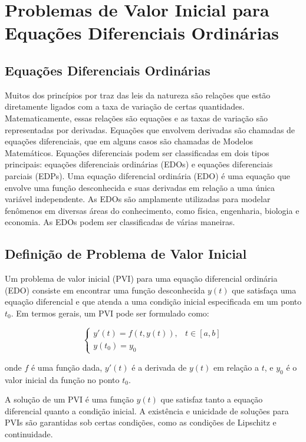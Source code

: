 \chapter{Problemas de Valor Inicial para Equações Diferenciais Ordinárias}

\section{Equações Diferenciais Ordinárias}
Muitos dos princípios por traz das leis da natureza são relações que estão diretamente ligados com a taxa de variação de certas quantidades. Matematicamente, essas relações são equações e as taxas de variação são representadas por derivadas. Equações que envolvem derivadas são chamadas de equações diferenciais, que em alguns casos são chamadas de Modelos Matemáticos. Equações diferenciais podem ser classificadas em dois tipos principais: equações diferenciais ordinárias (EDOs) e equações diferenciais parciais (EDPs).
Uma equação diferencial ordinária (EDO) é uma equação que envolve uma função desconhecida e suas derivadas em relação a uma única variável independente. As EDOs são amplamente utilizadas para modelar fenômenos em diversas áreas do conhecimento, como física, engenharia, biologia e economia. As EDOs podem ser classificadas de várias maneiras.

\section{Definição de Problema de Valor Inicial}

Um problema de valor inicial (PVI) para uma equação diferencial ordinária (EDO) consiste em encontrar uma função desconhecida $y(t)$ que satisfaça uma equação diferencial e que atenda a uma condição inicial especificada em um ponto $t_0$. Em termos gerais, um PVI pode ser formulado como:

\begin{equation}
    \begin{cases}
        y'(t) = f(t, y(t)), & t \in [a, b] \\
        y(t_0) = y_0
    \end{cases}
\end{equation}

onde $f$ é uma função dada, $y'(t)$ é a derivada de $y(t)$ em relação a $t$, e $y_0$ é o valor inicial da função no ponto $t_0$.

A solução de um PVI é uma função $y(t)$ que satisfaz tanto a equação diferencial quanto a condição inicial. A existência e unicidade de soluções para PVIs são garantidas sob certas condições, como as condições de Lipschitz e continuidade.

